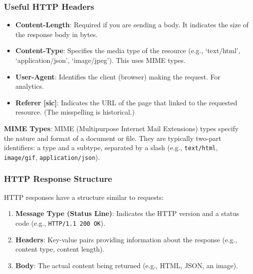 \subsubsection{Useful HTTP Headers}
\begin{itemize}
    \item \textbf{Content-Length}: Required if you are sending a body. It indicates the size of the response body in bytes.
    \item \textbf{Content-Type}: Specifies the media type of the resource (e.g., `text/html', `application/json', `image/jpeg').  This uses MIME types.
    \item \textbf{User-Agent}:  Identifies the client (browser) making the request. For analytics.
    \item \textbf{Referer [sic]}:  Indicates the URL of the page that linked to the requested resource.  (The misspelling is historical.)
\end{itemize}
\textbf{MIME Types}:
MIME (Multipurpose Internet Mail Extensions) types specify the nature and format of a document or file.  They are typically two-part identifiers: a type and a subtype, separated by a slash (e.g., \texttt{text/html}, \texttt{image/gif}, \texttt{application/json}).


\subsubsection{HTTP Response Structure}
HTTP responses have a structure similar to requests:
\begin{enumerate}[itemsep=1pt]
    \item \textbf{Message Type (Status Line)}: Indicates the HTTP version and a status code (e.g., \texttt{HTTP/1.1 200 OK}).
    \item \textbf{Headers}: Key-value pairs providing information about the response (e.g., content type, content length).
    \item  \textbf{Body}: The actual content being returned (e.g., HTML, JSON, an image).
\end{enumerate}

